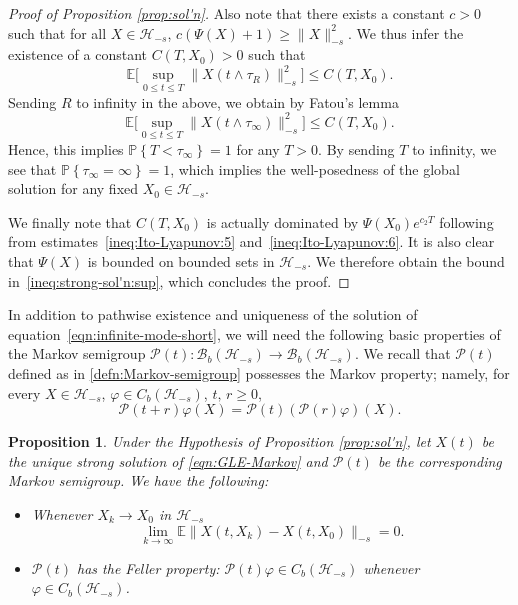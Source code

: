 \documentclass[11pt]{amsart}
\theoremstyle{definition}
\renewcommand{\H}{\mathcal{H}}
\newcommand{\PMarkov}{\mathcal{P}}
\newcommand{\B}{\mathcal{B}}
\newcommand{\la}{\langle}
\newcommand{\ra}{\rangle}
\newcommand{\Tr}{\text{Tr}}
\newcommand{\f}{\varphi}
\newcommand{\Enone}[1]{\mathbb{E}#1}
\renewcommand{\P}[1]{\mathbb{P}\left\{#1\right\}}
\newcommand{\Hs}{\mathcal{H}_{-s}}
\theoremstyle{definition}
\theoremstyle{plain}
\newtheorem{proposition}[theorem]{Proposition}
\numberwithin{equation}{section}
\begin{document}
\begin{proof}[Proof of Proposition \ref{prop:sol'n}]
Also note that there exists a constant $c>0$ such that for all $X\in\H_{-s} $, $c(\Psi(X)+1)\geq \|X\|^2_{-s}$. We thus infer the existence of a constant $C(T,X_0)>0$ such that
\begin{equation}\label{ineq:Ito-Lyapunov:6}
\Enone\Big[\sup_{0\leq t\leq T} \|X(t\wedge\tau_R)\|_{-s}^2 \Big]\leq C(T,X_0).
\end{equation}
Sending $R$ to infinity in the above, we obtain by Fatou's lemma  
\begin{equation}\label{ineq:Ito-Lyapunov:7}
\Enone\Big[\sup_{0\leq t\leq T} \|X(t\wedge\tau_\infty)\|_{-s}^2 \Big]\leq C(T,X_0).
\end{equation}
Hence, this implies $\P{T<\tau_\infty}=1$ for any $T>0$. By sending $T$ to infinity, we see that $\P{\tau_\infty=\infty}=1$, which implies the well-posedness of the global solution for any fixed $X_0 \in \mathcal{H}_{-s}$.  

We finally note that $C(T,X_0)$ is actually dominated by $\Psi(X_0)e^{c_2T}$ following from estimates~\eqref{ineq:Ito-Lyapunov:5} and~\eqref{ineq:Ito-Lyapunov:6}. It is also clear that $\Psi(X)$ is bounded on bounded sets in $\Hs$. We therefore obtain the bound in~\eqref{ineq:strong-sol'n:sup}, which concludes the proof.
\end{proof}
In addition to pathwise existence and uniqueness of the solution of equation~\eqref{eqn:infinite-mode-short}, we will need the following basic properties of the Markov semigroup $\PMarkov(t):\B_b(\H_{-s})\to\B_b(\H_{-s})$. We recall that $\PMarkov(t)$  defined as in \eqref{defn:Markov-semigroup} possesses the Markov property; namely, for every $X\in \H_{-s}$, $\f\in C_b(\H_{-s})$, $t,\, r\geq 0$,
\[\PMarkov(t+r)\f(X)=\PMarkov(t)\left(\PMarkov(r)\f\right)(X).\]
\begin{proposition}\label{prop:sol'n:feller} Under the Hypothesis of Proposition \ref{prop:sol'n}, let $X(t)$ be the unique strong solution of \eqref{eqn:GLE-Markov} and $\PMarkov(t)$ be the corresponding Markov semigroup. We have the following:
\begin{itemize}
\item[(a)] Whenever $X_k\rightarrow X_0$ in $\H_{-s}$ 
\begin{equation}\label{eqn:sol'n-1}
\lim_{k\to\infty}\Enone\|X(t,X_k)-X(t,X_0)\|_{-s}=0.
\end{equation}
\item[(b)] $\PMarkov(t)$ has the Feller property: $\PMarkov(t)\varphi\in C_b(\H_{-s})$ whenever $\varphi\in C_b(\H_{-s})$.
\end{itemize}
\end{proposition}  
\end{document}
